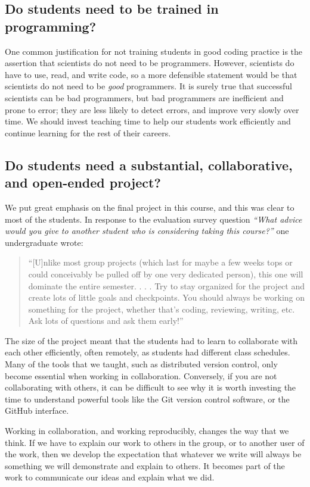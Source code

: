 \subsection{Do students need to be trained in programming?}

One common justification for not training students in good coding practice is
the assertion that scientists do not need to be programmers.  However, scientists do
have to use, read, and write code, so a more defensible
statement would be that scientists do not need to be \emph{good} programmers.
It is surely true that successful scientists can be bad programmers, but bad
programmers are inefficient and prone to error; they are less likely to detect
errors, and improve very slowly over time.  We should invest teaching time
to help our students work efficiently and continue learning for the rest of
their careers.

\subsection{Do students need a substantial, collaborative, and open-ended project?}

We put great emphasis on the final project in this course, and this was clear
to most of the students.  In response to the evaluation survey question
\emph{``What advice would you give to another student who is considering taking this course?''}
one undergraduate wrote:
\begin{quotation}
``[U]nlike most group projects (which last for maybe a few weeks tops or
could conceivably be pulled off by one very dedicated person), this one will
dominate the entire semester. . . . Try to stay organized for the project and
create lots of little goals and checkpoints. You should always be working on
something for the project, whether that's coding, reviewing, writing, etc. Ask
lots of questions and ask them early!''
\end{quotation}

The size of the project meant that the students had to learn to
collaborate with each other efficiently, often remotely, as students had
different class schedules.  Many of the tools that we taught, such as
distributed version control, only become essential when working in
collaboration.  Conversely, if you are not collaborating with others, it can
be difficult to see why it is worth investing the time to understand powerful
tools like the Git version control software, or the GitHub interface.

Working in collaboration, and working reproducibly, changes the way that we
think.  If we have to explain our work to others in the group, or to
another user of the work, then we develop the expectation that whatever we
write will always be something we will demonstrate and explain to others.  It
becomes part of the work to communicate our ideas and explain what we did.

